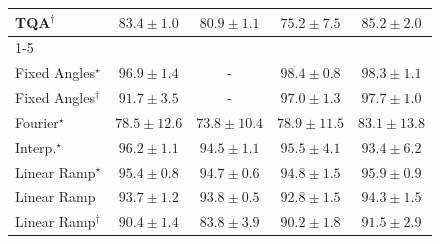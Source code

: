 \begin{tabular}{l|cccc|}
TQA$^\dagger$ & {\cellcolor[HTML]{359C53}} \color[HTML]{F1F1F1} $83.4\pm 1.0$ & {\cellcolor[HTML]{43AC5E}} \color[HTML]{F1F1F1} $80.9\pm 1.1$ & {\cellcolor[HTML]{7AC77A}} \color[HTML]{000000} $75.2\pm 7.5$ & {\cellcolor[HTML]{2C8F4B}} \color[HTML]{F1F1F1} $85.2\pm 2.0$ \\
\cline{1-5}
\multicolumn{5}{c}{\rule{0pt}{8pt}SV} \\
\midrule
Fixed Angles$^\star$ & {\cellcolor[HTML]{034165}} \color[HTML]{F1F1F1} $96.9\pm 1.4$ & {\cellcolor[HTML]{000000}} \color[HTML]{F1F1F1} {\cellcolor{white}} \color{black} - & {\cellcolor[HTML]{023858}} \color[HTML]{F1F1F1} $98.4\pm 0.8$ & {\cellcolor[HTML]{023858}} \color[HTML]{F1F1F1} $98.3\pm 1.1$ \\
Fixed Angles$^\dagger$ & {\cellcolor[HTML]{045E93}} \color[HTML]{F1F1F1} $91.7\pm 3.5$ & {\cellcolor[HTML]{000000}} \color[HTML]{F1F1F1} {\cellcolor{white}} \color{black} - & {\cellcolor[HTML]{023F64}} \color[HTML]{F1F1F1} $97.0\pm 1.3$ & {\cellcolor[HTML]{023B5D}} \color[HTML]{F1F1F1} $97.7\pm 1.0$ \\
Fourier$^\star$ & {\cellcolor[HTML]{529BC7}} \color[HTML]{F1F1F1} $78.5\pm 12.6$ & {\cellcolor[HTML]{81AED2}} \color[HTML]{F1F1F1} $73.8\pm 10.4$ & {\cellcolor[HTML]{4E9AC6}} \color[HTML]{F1F1F1} $78.9\pm 11.5$ & {\cellcolor[HTML]{2685BB}} \color[HTML]{F1F1F1} $83.1\pm 13.8$ \\
Interp.$^\star$ & {\cellcolor[HTML]{03456C}} \color[HTML]{F1F1F1} $96.2\pm 1.1$ & {\cellcolor[HTML]{034E7B}} \color[HTML]{F1F1F1} $94.5\pm 1.1$ & {\cellcolor[HTML]{034973}} \color[HTML]{F1F1F1} $95.5\pm 4.1$ & {\cellcolor[HTML]{045585}} \color[HTML]{F1F1F1} $93.4\pm 6.2$ \\
Linear Ramp$^\star$ & {\cellcolor[HTML]{034973}} \color[HTML]{F1F1F1} $95.4\pm 0.8$ & {\cellcolor[HTML]{034D79}} \color[HTML]{F1F1F1} $94.7\pm 0.6$ & {\cellcolor[HTML]{034D79}} \color[HTML]{F1F1F1} $94.8\pm 1.5$ & {\cellcolor[HTML]{03466E}} \color[HTML]{F1F1F1} $95.9\pm 0.9$ \\
Linear Ramp & {\cellcolor[HTML]{045483}} \color[HTML]{F1F1F1} $93.7\pm 1.2$ & {\cellcolor[HTML]{045382}} \color[HTML]{F1F1F1} $93.8\pm 0.5$ & {\cellcolor[HTML]{04598C}} \color[HTML]{F1F1F1} $92.8\pm 1.5$ & {\cellcolor[HTML]{034F7D}} \color[HTML]{F1F1F1} $94.3\pm 1.5$ \\
Linear Ramp$^\dagger$ & {\cellcolor[HTML]{04629A}} \color[HTML]{F1F1F1} $90.4\pm 1.4$ & {\cellcolor[HTML]{2081B9}} \color[HTML]{F1F1F1} $83.8\pm 3.9$ & {\cellcolor[HTML]{04639B}} \color[HTML]{F1F1F1} $90.2\pm 1.8$ & {\cellcolor[HTML]{045E94}} \color[HTML]{F1F1F1} $91.5\pm 2.9$ \\

\end{tabular}
